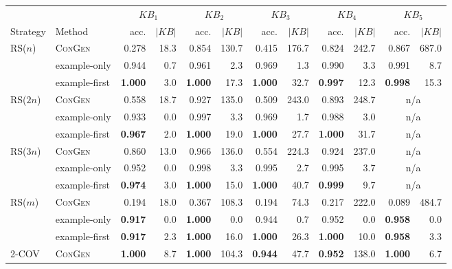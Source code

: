 \begin{tabular}{llrrrrrrrrrr}
\toprule
 &  & \multicolumn{2}{c}{$KB_1$} & \multicolumn{2}{c}{$KB_2$} & \multicolumn{2}{c}{$KB_3$} & \multicolumn{2}{c}{$KB_4$} & \multicolumn{2}{c}{$KB_5$} \\
\cmidrule(lr){3-4} \cmidrule(lr){5-6} \cmidrule(lr){7-8} \cmidrule(lr){9-10} \cmidrule(lr){11-12}
Strategy & Method & acc. & $|KB|$ & acc. & $|KB|$ & acc. & $|KB|$ & acc. & $|KB|$ & acc. & $|KB|$ \\
\midrule
\multirow{3}{*}{RS($n$)} & \textsc{ConGen} & 0.278 & 18.3 & 0.854 & 130.7 & 0.415 & 176.7 & 0.824 & 242.7 & 0.867 & 687.0 \\
 & example-only & 0.944 & 0.7 & 0.961 & 2.3 & 0.969 & 1.3 & 0.990 & 3.3 & 0.991 & 8.7 \\
 & example-first & \textbf{1.000} & 3.0 & \textbf{1.000} & 17.3 & \textbf{1.000} & 32.7 & \textbf{0.997} & 12.3 & \textbf{0.998} & 15.3 \\
\midrule
\multirow{3}{*}{RS($2n$)} & \textsc{ConGen} & 0.558 & 18.7 & 0.927 & 135.0 & 0.509 & 243.0 & 0.893 & 248.7 & \multicolumn{2}{c}{n/a} \\
 & example-only & 0.933 & 0.0 & 0.997 & 3.3 & 0.969 & 1.7 & 0.988 & 3.0 & \multicolumn{2}{c}{n/a} \\
 & example-first & \textbf{0.967} & 2.0 & \textbf{1.000} & 19.0 & \textbf{1.000} & 27.7 & \textbf{1.000} & 31.7 & \multicolumn{2}{c}{n/a} \\
\midrule
\multirow{3}{*}{RS($3n$)} & \textsc{ConGen} & 0.860 & 13.0 & 0.966 & 136.0 & 0.554 & 224.3 & 0.924 & 237.0 & \multicolumn{2}{c}{n/a} \\
 & example-only & 0.952 & 0.0 & 0.998 & 3.3 & 0.995 & 2.7 & 0.995 & 3.7 & \multicolumn{2}{c}{n/a} \\
 & example-first & \textbf{0.974} & 3.0 & \textbf{1.000} & 15.0 & \textbf{1.000} & 40.7 & \textbf{0.999} & 9.7 & \multicolumn{2}{c}{n/a} \\
\midrule
\multirow{3}{*}{RS($m$)} & \textsc{ConGen} & 0.194 & 18.0 & 0.367 & 108.3 & 0.194 & 74.3 & 0.217 & 222.0 & 0.089 & 484.7 \\
 & example-only & \textbf{0.917} & 0.0 & \textbf{1.000} & 0.0 & 0.944 & 0.7 & 0.952 & 0.0 & \textbf{0.958} & 0.0 \\
 & example-first & \textbf{0.917} & 2.3 & \textbf{1.000} & 16.0 & \textbf{1.000} & 26.3 & \textbf{1.000} & 10.0 & \textbf{0.958} & 3.3 \\
\midrule
\multirow{3}{*}{2-COV} & \textsc{ConGen} & \textbf{1.000} & 8.7 & \textbf{1.000} & 104.3 & \textbf{0.944} & 47.7 & \textbf{0.952} & 138.0 & \textbf{1.000} & 6.7 \\

\end{tabular}
